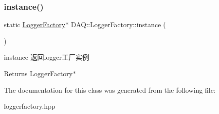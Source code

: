 \subsubsection{\texorpdfstring{instance()}{instance()}}
{\footnotesize\ttfamily static \hyperlink{classDAQ_1_1LoggerFactory}{Logger\+Factory}$\ast$ D\+A\+Q\+::\+Logger\+Factory\+::instance (\begin{DoxyParamCaption}{ }\end{DoxyParamCaption})\hspace{0.3cm}{\ttfamily [static]}}



instance 返回logger工厂实例 

\begin{DoxyReturn}{Returns}
Logger\+Factory$\ast$ 
\end{DoxyReturn}


The documentation for this class was generated from the following file\+:\begin{DoxyCompactItemize}
\item 
loggerfactory.\+hpp\end{DoxyCompactItemize}
